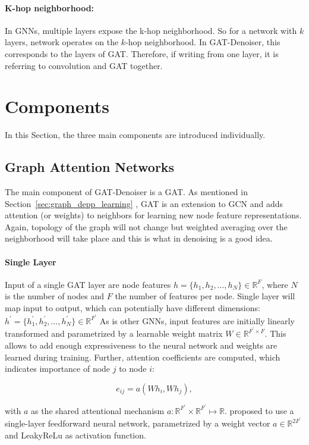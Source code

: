 \paragraph{K-hop neighborhood:}
In GNNs, multiple layers expose the k-hop neighborhood. So for a network with $k$ layers,
network operates on the $k$-hop neighborhood. In GAT-Denoiser, this corresponds
to the layers of GAT. Therefore, if writing from one layer, it is referring to convolution and GAT together.

\section{Components}
In this Section, the three main components are introduced individually.

\subsection{Graph Attention Networks}
The main component of GAT-Denoiser is a GAT.
As mentioned in Section~\ref{sec:graph_depp_learning} \textit{}, GAT is an extension to GCN and 
adds attention (or weights) to neighbors for learning new node feature representations. 
Again, topology of the graph will not change but weighted averaging over the neighborhood 
will take place and this is what in denoising is a good idea.

\paragraph{Single Layer}
Input of a single GAT layer are node features $h = \{ h_1, h_2, \dots , h_N \} \in \mathbb{R}^F$, 
where $N$ is the number of nodes and $F$ the number of features per node. 
Single layer will map input to output, which can potentially have different dimensions: 
$h^{\prime} = \{ h_1^{\prime}, h_2^{\prime}, \dots, h_N^{\prime} \} \in \mathbb{R}^{F^{\prime}} $
As is other GNNs, input features are initially linearly transformed and parametrized by a learnable weight matrix 
$W \in \mathbb{R}^{F^{\prime} \times F}$. 
This allows to add enough expressiveness to the neural network and weights are learned during training.
Further, attention coefficients are computed, which indicates importance of node $j$ to node $i$:

\begin{equation}
  e_{ij} = a(Wh_i, Wh_j),
\end{equation}

with $a$ as the shared attentional mechanism $a : \mathbb{R}^{F^{\prime}} \times \mathbb{R}^{F^{\prime}} \mapsto \mathbb{R}$.
\citet{GAT} proposed to use a single-layer feedforward neural network, parametrized by a weight vector $a \in \mathbb{R}^{2F^{\prime}}$
and LeakyReLu as activation function.

